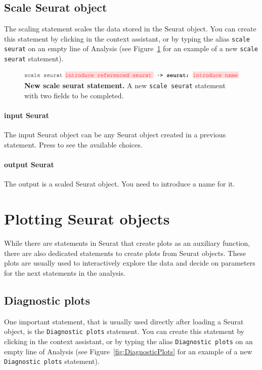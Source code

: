 \subsection{Scale Seurat object}
The scaling statement scales the data stored in the Seurat object.
You can create this statement by clicking  in the context assistant,
or by typing the alias \texttt{scale seurat} on an empty line of Analysis (see Figure~\ref{fig:ScaleSeurat}
for an example of a new \texttt{scale seurat} statement).

\begin{figure}[h!tbp]
  \centering
  \includegraphics[width=\figWidthWide]{figures/ScaleSeurat.pdf}
    \caption[New scale seurat statement.]{\textbf{New scale seurat statement.}
    A new \texttt{scale seurat} statement with two fields to be completed.}
\label{fig:ScaleSeurat}
\end{figure}

\paragraph{input Seurat}
The input Seurat object can be any Seurat object created in a previous statement. Press
\keys{\ctrl+\space} to see the available choices.

\paragraph{output Seurat}
The output is a scaled Seurat object. You need to introduce a name for it.

\section{Plotting Seurat objects}
While there are statements in Seurat that create plots as an auxiliary function,
there are also dedicated statements to create plots from Seurat objects. These plots are
usually used to interactively explore the data and decide on parameters for the next
statements in the analysis.

\subsection{Diagnostic plots}\label{subsec:DiagnosticPlots}
One important statement, that is usually used directly after loading a Seurat object, is the
\texttt{Diagnostic plots} statement. You can create this statement by clicking
 in the context assistant, or by typing
the alias \texttt{Diagnostic plots} on an empty line of Analysis (see Figure~\ref{fig:DiagnosticPlots}
for an example of a new \texttt{Diagnostic plots} statement).

